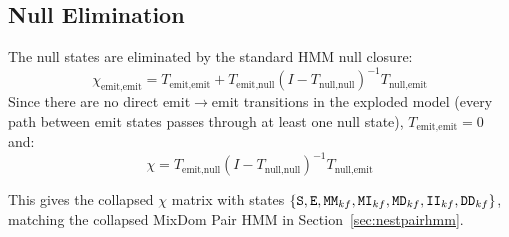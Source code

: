 \subsection{Null Elimination}

The null states are eliminated by the standard HMM null closure:
\[
\chi_{\text{emit},\text{emit}} = T_{\text{emit},\text{emit}}
+ T_{\text{emit},\text{null}} (I - T_{\text{null},\text{null}})^{-1} T_{\text{null},\text{emit}}
\]
Since there are no direct emit$\to$emit transitions in the exploded model
(every path between emit states passes through at least one null state),
$T_{\text{emit},\text{emit}} = 0$ and:
\[
\chi = T_{\text{emit},\text{null}} (I - T_{\text{null},\text{null}})^{-1} T_{\text{null},\text{emit}}
\]

This gives the collapsed $\chi$ matrix with states
$\{{\tt S}, {\tt E}, \mathtt{MM}_{kf}, \mathtt{MI}_{kf}, \mathtt{MD}_{kf}, \mathtt{II}_{kf}, \mathtt{DD}_{kf}\}$,
matching the collapsed MixDom Pair HMM in Section~\ref{sec:nestpairhmm}.

